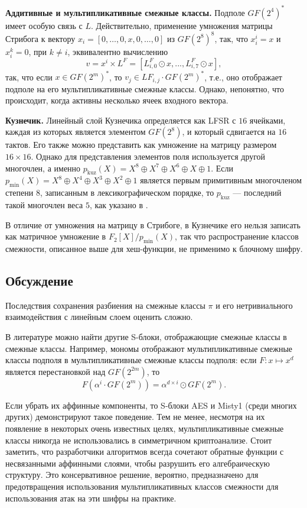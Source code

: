 \textbf{Аддитивные и мультипликативные смежные классы.} Подполе $GF(2^4)^*$ имеет особую связь с $L$. Действительно, применение умножения матрицы Стрибога к вектору \(x_i = [0, \ldots, 0, x, 0, \ldots, 0]\) из $GF(2^8)^8$, так, что \(x_i^i = x\) и \(x_i^k = 0\), при \(k \neq i\), эквивалентно вычислению
\[
v = x^i \times L^F = [L^F_{i,0} \odot x, ..., L^F_{i,7} \odot x],
\]
так, что если \(x \in GF(2^m)^*\), то \(v_j \in LF_{i,j} \cdot GF(2^m)^*\), т.е., оно отображает подполе на его мультипликативные смежные классы. Однако, непонятно, что происходит, когда активны несколько ячеек входного вектора.

\textbf{Кузнечик.} Линейный слой Кузнечика определяется как LFSR с $16$ ячейками, каждая из которых является элементом $GF(2^8)$, и который сдвигается на $16$ тактов. Его также можно представить как умножение на матрицу размером $16 \times 16$. Однако для представления элементов поля используется другой многочлен, а именно \(p_{\text{kuz}}(X) = X^8 \oplus X^7 \oplus X^6 \oplus X \oplus 1\). Если \(p_{\text{min}}(X) = X^8 \oplus X^4 \oplus X^3 \oplus X^2 \oplus 1\) является первым примитивным многочленом степени $8$, записанным в лексикографическом порядке, то \(p_{\text{kuz}}\) — последний такой многочлен веса $5$, как указано в \cite{LN97}.

В отличие от умножения на матрицу в Стрибоге, в Кузнечике его нельзя записать как матричное умножение в $F_2[X]/p_{\text{min}}(X)$, так что распространение классов смежности, описанное выше для хеш-функции, не применимо к блочному шифру.

\subsection{Обсуждение}

Последствия сохранения разбиения на смежные классы \(\pi\) и его нетривиального взаимодействия с линейным слоем оценить сложно.

В литературе можно найти другие S-блоки, отображающие смежные классы в смежные классы. Например, мономы отображают мультипликативные смежные классы подполя в мультипликативные смежные классы подполя: если \(F: x \mapsto x^d\) является перестановкой над $GF(2^{2m})$, то
\[
F(\alpha^i \cdot GF(2^m)) = \alpha^{d \times i} \odot GF(2^m).
\]

Если убрать их аффинные компоненты, то S-блоки AES \cite{AES01} и Misty1 \cite{Mat97} (среди многих других) демонстрируют такое поведение. Тем не менее, несмотря на их появление в некоторых очень известных целях, мультипликативные смежные классы никогда не использовались в симметричном криптоанализе. Стоит заметить, что разработчики алгоритмов всегда сочетают обратные функции с несвязанными аффинными слоями, чтобы разрушить его алгебраическую структуру. Это консервативное решение, вероятно, предназначено для предотвращения использования мультипликативных классов смежности для использования атак на эти шифры на практике.

